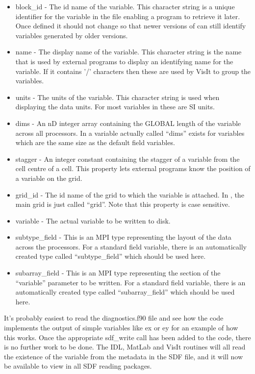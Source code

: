 \documentclass[12pt,a4paper]{article}
\newcommand{\EPOCH}{{\color{warwickdark}\fontfamily{phv}\selectfont{EPOCH}}}
\begin{document}
\begin{itemize}
\item block\_id - The id name of the variable. This character string is a
  unique identifier for
  the variable in the file enabling a program to retrieve it later. Once
  defined it should not change so that newer versions of {\EPOCH} can still
  identify variables generated by older versions.
\item name - The display name of the variable. This character string is
  the name that is used
  by external programs to display an identifying name for the variable. If it
  contains '/' characters then these are used by VisIt to group the variables.
\item units - The units of the variable. This character string is used when
  displaying the data units. For most variables in {\EPOCH} these
  are SI units.
\item dims - An nD integer array containing the GLOBAL length of the variable
  across all processors. In {\EPOCH} a variable actually called ``dims'' exists
  for variables which are the same size as the default field variables.
\item stagger - An integer constant containing the stagger of a variable from
  the cell centre of a cell. This property lets external programs know the
  position of a variable on the grid.
\item grid\_id - The id name of the grid to which the variable is attached. In
  {\EPOCH}, the main grid is just called ``grid''. Note that this property is
  case sensitive.
\item variable - The actual variable to be written to disk.
\item subtype\_field - This is an MPI type representing the layout of the data
  across the processors. For a standard field variable, there is an
  automatically created type called ``subtype\_field'' which should be used
  here.
\item subarray\_field - This is an MPI type representing the section of
  the ``variable'' parameter to be written. For a standard field variable,
  there is an automatically created type called ``subarray\_field'' which
  should be used here.
\end{itemize}

It's probably easiest to read the diagnostics.f90 file and see how the code
implements the output of simple variables like ex or ey for an example of how
this works. Once the appropriate sdf\_write call has
been added to the code, there is no further work
to be done. The IDL, MatLab and VisIt routines will all read the existence of
the variable from the metadata in the SDF file, and it will now be available to
view in all SDF reading packages.
\end{document}

